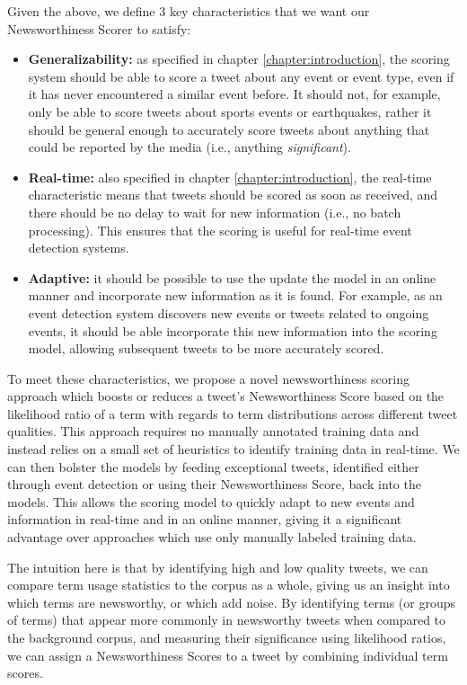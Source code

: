 Given the above, we define 3 key characteristics that we want our Newsworthiness Scorer to satisfy:
\begin{itemize}
	\item \textbf{Generalizability:} as specified in chapter \ref{chapter:introduction}, the scoring system should be able to score a tweet about any event or event type, even if it has never encountered a similar event before. It should not, for example, only be able to score tweets about sports events or earthquakes, rather it should be general enough to accurately score tweets about anything that could be reported by the media (i.e., anything \emph{significant}).
	\item \textbf{Real-time:} also specified in chapter \ref{chapter:introduction}, the real-time characteristic means that tweets should be scored as soon as received, and there should be no delay to wait for new information (i.e., no batch processing). This ensures that the scoring is useful for real-time event detection systems.
	\item \textbf{Adaptive:} it should be possible to use the update the model in an online manner and incorporate new information as it is found. For example, as an event detection system discovers new events or tweets related to ongoing events, it should be able incorporate this new information into the scoring model, allowing subsequent tweets to be more accurately scored.
\end{itemize}

To meet these characteristics, we propose a novel newsworthiness scoring approach which boosts or reduces a tweet's Newsworthiness Score based on the likelihood ratio of a term with regards to term distributions across different tweet qualities.
This approach requires no manually annotated training data and instead relies on a small set of heuristics to identify training data in real-time. We can then bolster the models by feeding exceptional tweets, identified either through event detection or using their Newsworthiness Score, back into the models.
This allows the scoring model to quickly adapt to new events and information in real-time and in an online manner, giving it a significant advantage over approaches which use only manually labeled training data.

The intuition here is that by identifying high and low quality tweets, we can compare term usage statistics to the corpus as a whole, giving us an insight into which terms are newsworthy, or which add noise.
By identifying terms (or groups of terms) that appear more commonly in newsworthy tweets when compared to the background corpus, and measuring their significance using likelihood ratios, we can assign a Newsworthiness Scores to a tweet by combining individual term scores.

